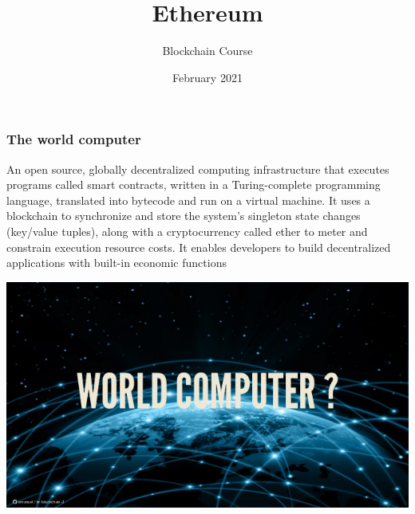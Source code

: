 \documentclass[11pt]{beamer}  %
\subtitle{Blockchain Course}
\title{Ethereum}
\institute{Universit\`a di Verona, Italy}
\date{February 2021}
\begin{document}
\begin{frame}
  \titlepage
\end{frame}

\begin{frame}
  \frametitle{The world computer}

  \begin{greenbox}{}
    An open source, globally \alert{decentralized computing infrastructure}
    that executes programs called \alert{smart contracts}, written
    in a \alert{Turing-complete} programming language, translated into
    bytecode and run on a \alert{virtual machine}. It uses a
    \alert{blockchain} to synchronize and store the system's \alert{singleton state} changes
    (key/value tuples), along
    with a cryptocurrency called \alert{ether} to \alert{meter and constrain}
    execution resource costs. It enables developers to build
    \alert{decentralized applications} with \alert{built-in economic functions}
  \end{greenbox}

  \begin{center}
    \includegraphics[scale=0.3,clip=false]{pictures/world-computer.jpg}
  \end{center}

\end{frame}
\end{document}
